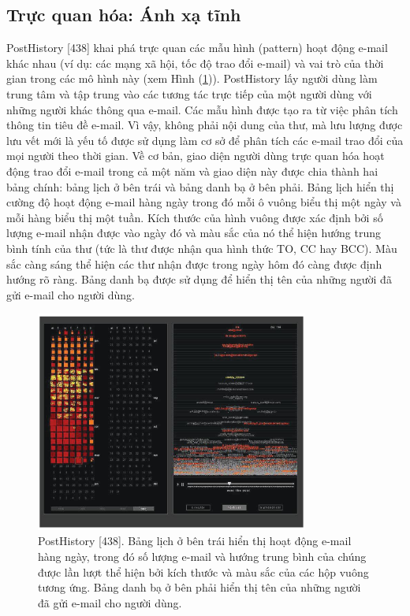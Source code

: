 \subsection{Trực quan hóa: Ánh xạ tĩnh}
PostHistory [438] khai phá trực quan các mẫu hình (pattern) hoạt động e-mail khác nhau (ví dụ: các mạng xã hội, tốc độ trao đổi e-mail) và vai trò của thời gian trong các mô hình này (xem Hình (\ref{fig:f7.12})). PostHistory lấy người dùng làm trung tâm và tập trung vào các tương tác trực tiếp của một người dùng với những người khác thông qua e-mail. Các mẫu hình được tạo ra từ việc phân tích thông tin tiêu đề e-mail. Vì vậy, không phải nội dung của thư, mà lưu lượng được lưu vết mới là yếu tố được sử dụng làm cơ sở để phân tích các e-mail trao đổi của mọi người theo thời gian. Về cơ bản, giao diện người dùng trực quan hóa hoạt động trao đổi e-mail trong cả một năm và giao diện này được chia thành hai bảng chính: bảng lịch ở bên trái và bảng danh bạ ở bên phải. Bảng lịch hiển thị cường độ hoạt động e-mail hàng ngày trong đó mỗi ô vuông biểu thị một ngày và mỗi hàng biểu thị một tuần. Kích thước của hình vuông được xác định bởi số lượng e-mail nhận được vào ngày đó và màu sắc của nó thể hiện hướng trung bình tính của thư (tức là thư được nhận qua hình thức TO, CC hay BCC). Màu sắc càng sáng thể hiện các thư nhận được trong ngày hôm đó càng được định hướng rõ ràng. Bảng danh bạ được sử dụng để hiển thị tên của những người đã gửi e-mail cho người dùng.
\begin{figure}[H] %
    \centering %
    \includegraphics[width=0.8\textwidth]{assets/fig_7_12.png} 
    \caption{PostHistory [438]. Bảng lịch ở bên trái hiển thị hoạt động e-mail hàng ngày, trong đó số lượng e-mail và hướng trung bình của chúng được lần lượt thể hiện bởi kích thước và màu sắc của các hộp vuông tương ứng. Bảng danh bạ ở bên phải hiển thị tên của những người đã gửi e-mail cho người dùng.} %
    \label{fig:f7.12}
\end{figure}